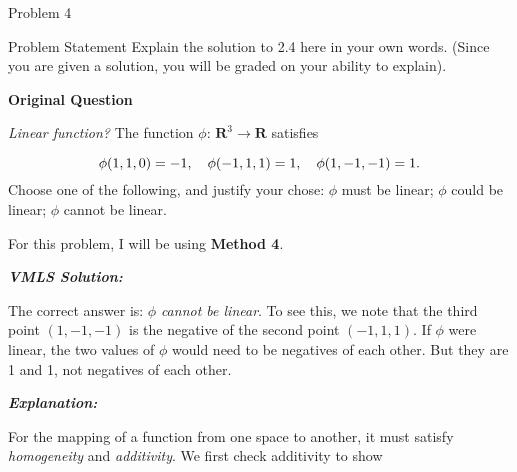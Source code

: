\begin{problem}{Problem 4}
    \begin{statement}{Problem Statement}
        Explain the solution to 2.4 here in your own words. (Since you are given a solution, you will be graded on your ability to explain). \vspace*{1em}

        \textbf{Original Question} \vspace*{1em}

        \textit{Linear function?} The function $\phi$: $\mathbf{R}^{3} \rightarrow \mathbf{R}$ satisfies

        \begin{equation*}
            \phi(1,1,0) = -1, \hspace*{10pt} \phi(-1,1,1) = 1, \hspace*{10pt} \phi(1,-1,-1) = 1.
        \end{equation*}
        Choose one of the following, and justify your chose: $\phi$ must be linear; $\phi$ could be linear; $\phi$ cannot be linear.
    \end{statement}

    \begin{highlight}[Solution]
        For this problem, I will be using \textbf{Method 4}. \vspace*{1em}

        \textbf{\textit{VMLS Solution:}} \vspace*{1em}

        The correct answer is: $\phi$ \textit{cannot be linear}. To see this, we note that the third point $(1,-1,-1)$ is the negative of the second point $(-1,1,1)$. If $\phi$ were linear,
        the two values of $\phi$ would need to be negatives of each other. But they are 1 and 1, not negatives of each other. \vspace*{1em}

        \textbf{\textit{Explanation:}} \vspace*{1em}

        For the mapping of a function from one space to another, it must satisfy \textit{homogeneity} and \textit{additivity}. We first check additivity to show


\end{highlight}
\end{problem}
